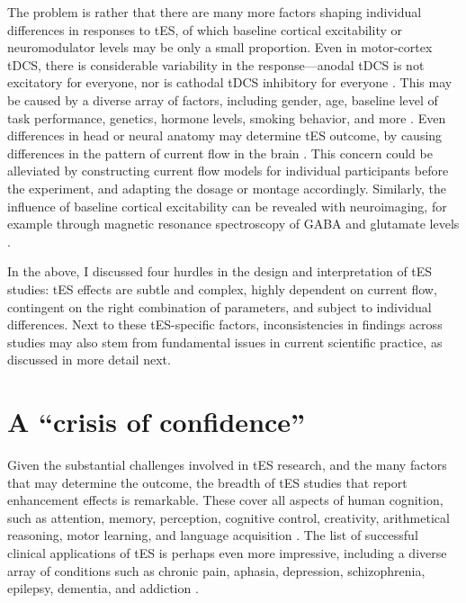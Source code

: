 \documentclass[11pt,]{memoir}
\begin{document}
The problem is rather that there are many more factors shaping individual differences in responses to tES, of which baseline cortical excitability or neuromodulator levels may be only a small proportion. Even in motor-cortex tDCS, there is considerable variability in the response---anodal tDCS is not excitatory for everyone, nor is cathodal tDCS inhibitory for everyone \autocites{Chew2015}{Jamil2017}{Lopez-Alonso2014}{Strube2016}{Wiethoff2014}. This may be caused by a diverse array of factors, including gender, age, baseline level of task performance, genetics, hormone levels, smoking behavior, and more \autocites{Krause2014}{Li2015b}. Even differences in head or neural anatomy may determine tES outcome, by causing differences in the pattern of current flow in the brain \autocites{Kim2014}{Laakso2018}. This concern could be alleviated by constructing current flow models for individual participants before the experiment, and adapting the dosage or montage accordingly. Similarly, the influence of baseline cortical excitability can be revealed with neuroimaging, for example through magnetic resonance spectroscopy of GABA and glutamate levels \autocites{Filmer2019}{Talsma2018}.

In the above, I discussed four hurdles in the design and interpretation of tES studies: tES effects are subtle and complex, highly dependent on current flow, contingent on the right combination of parameters, and subject to individual differences. Next to these tES-specific factors, inconsistencies in findings across studies may also stem from fundamental issues in current scientific practice, as discussed in more detail next.

\hypertarget{a-crisis-of-confidence}{%
\section{A ``crisis of confidence''}\label{a-crisis-of-confidence}}

Given the substantial challenges involved in tES research, and the many factors that may determine the outcome, the breadth of tES studies that report enhancement effects is remarkable. These cover all aspects of human cognition, such as attention, memory, perception, cognitive control, creativity, arithmetical reasoning, motor learning, and language acquisition \autocites{Coffman2014}{Dedoncker2016a}{Santarnecchi2015}. The list of successful clinical applications of tES is perhaps even more impressive, including a diverse array of conditions such as chronic pain, aphasia, depression, schizophrenia, epilepsy, dementia, and addiction \autocite{Lefaucheur2016a}.
\end{document}

